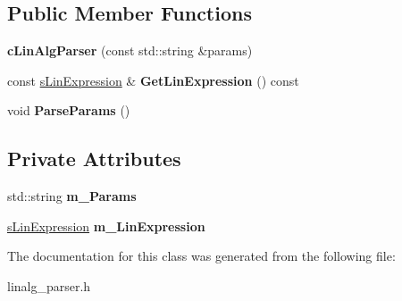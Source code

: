\subsection*{Public Member Functions}
\begin{DoxyCompactItemize}
\item 
\hypertarget{classengine_1_1cLinAlgParser_a6369536164de16187aedab6e4b9b76a8}{{\bfseries c\-Lin\-Alg\-Parser} (const std\-::string \&params)}\label{classengine_1_1cLinAlgParser_a6369536164de16187aedab6e4b9b76a8}

\item 
\hypertarget{classengine_1_1cLinAlgParser_a8f9de9da32b35ae3573bcdb0ab2bb495}{const \hyperlink{structengine_1_1sLinExpression}{s\-Lin\-Expression} \& {\bfseries Get\-Lin\-Expression} () const }\label{classengine_1_1cLinAlgParser_a8f9de9da32b35ae3573bcdb0ab2bb495}

\item 
\hypertarget{classengine_1_1cLinAlgParser_a9a23d51df31540dc963e6243766ede95}{void {\bfseries Parse\-Params} ()}\label{classengine_1_1cLinAlgParser_a9a23d51df31540dc963e6243766ede95}

\end{DoxyCompactItemize}
\subsection*{Private Attributes}
\begin{DoxyCompactItemize}
\item 
\hypertarget{classengine_1_1cLinAlgParser_a36ea24be1ea26ff93f18e864953cda55}{std\-::string {\bfseries m\-\_\-\-Params}}\label{classengine_1_1cLinAlgParser_a36ea24be1ea26ff93f18e864953cda55}

\item 
\hypertarget{classengine_1_1cLinAlgParser_a1b1c5374cb4d99c51a940dd0c9ff5179}{\hyperlink{structengine_1_1sLinExpression}{s\-Lin\-Expression} {\bfseries m\-\_\-\-Lin\-Expression}}\label{classengine_1_1cLinAlgParser_a1b1c5374cb4d99c51a940dd0c9ff5179}

\end{DoxyCompactItemize}


The documentation for this class was generated from the following file\-:\begin{DoxyCompactItemize}
\item 
linalg\-\_\-parser.\-h\end{DoxyCompactItemize}
